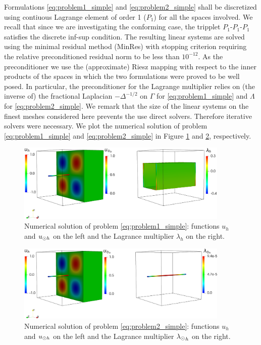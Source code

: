 Formulations \eqref{eq:problem1_simple} and \eqref{eq:problem2_simple} shall
be discretized using contiuous Lagrange element of order 1 ($P_1$) for all the spaces
involved. We recall that since we are investigating the conforming case, the tripplet
$P_1$-$P_1$-$P_1$ satisfies
the discrete inf-sup condition. The resulting linear systems are solved
using the minimal residual method (MinRes) with stopping criterion requiring the relative
preconditioned residual norm to be less than $10^{-12}$. As the preconditioner
we use the (approximate) Riesz mapping with respect to the inner products of
the spaces in which the two formulations were proved to be well posed.
In particular, the preconditioner for the Lagrange multiplier relies on
(the inverse of) the fractional Laplacian $-\Delta^{-1/2}$ on $\Gamma$ for
\eqref{eq:problem1_simple} and $\Lambda$ for \eqref{eq:problem2_simple}.
We remark that the size of the linear systems on the finest meshes considered
here prevents the use direct solvers. Therefore iterative solvers were necessary.
We plot the numerical solution of problem \eqref{eq:problem1_simple} and \eqref{eq:problem2_simple} in
Figure \ref{fig:sol_benchm1} and \ref{fig:sol_benchm2}, respectively. 

\begin{figure}
\centering
\includegraphics[width = 0.9\textwidth]{./graphics/mfs_LM2d}
\caption{Numerical solution of problem \eqref{eq:problem1_simple}: functions $u_h$ and $u_{\odot h}$ on the left and the Lagrance multiplier $\lambda_h$ on the right.}\label{fig:sol_benchm1}
\end{figure}

\begin{figure}
\centering
\includegraphics[width = 0.9\textwidth]{./graphics/mfs_LM1d}
\caption{Numerical solution of problem \eqref{eq:problem2_simple}: functions $u_h$ and $u_{\odot h}$ on the left and the Lagrance multiplier ${\lambda_{\odot}}_h$ on the right.}\label{fig:sol_benchm2}
\end{figure}

